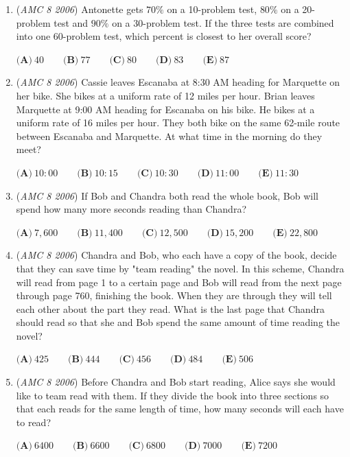 \begin{enumerate}
	\item (\textit{AMC 8 2006}) Antonette gets $70 \%$ on a 10-problem test, $80 \%$ on a 20-problem test and $90 \%$ on a 30-problem test. If the three tests are combined into one 60-problem test, which percent is closest to her overall score? 


 $\textbf{(A)}\ 40\qquad\textbf{(B)}\ 77\qquad\textbf{(C)}\ 80\qquad\textbf{(D)}\ 83\qquad\textbf{(E)}\ 87$


	\item (\textit{AMC 8 2006}) Cassie leaves Escanaba at 8:30 AM heading for Marquette on her bike. She bikes at a uniform rate of 12 miles per hour. Brian leaves Marquette at 9:00 AM heading for Escanaba on his bike. He bikes at a uniform rate of 16 miles per hour. They both bike on the same 62-mile route between Escanaba and Marquette. At what time in the morning do they meet? 


 $\textbf{(A)}\ 10: 00\qquad\textbf{(B)}\ 10: 15\qquad\textbf{(C)}\ 10: 30\qquad\textbf{(D)}\ 11: 00\qquad\textbf{(E)}\ 11: 30$


	\item (\textit{AMC 8 2006}) If Bob and Chandra both read the whole book, Bob will spend how many more seconds reading than Chandra? 


 $\textbf{(A)}\ 7,600\qquad\textbf{(B)}\ 11,400\qquad\textbf{(C)}\ 12,500\qquad\textbf{(D)}\ 15,200\qquad\textbf{(E)}\ 22,800$


	\item (\textit{AMC 8 2006}) Chandra and Bob, who each have a copy of the book, decide that they can save time by "team reading" the novel. In this scheme, Chandra will read from page 1 to a certain page and Bob will read from the next page through page 760, finishing the book. When they are through they will tell each other about the part they read. What is the last page that Chandra should read so that she and Bob spend the same amount of time reading the novel?


 $\textbf{(A)}\ 425\qquad\textbf{(B)}\ 444\qquad\textbf{(C)}\ 456\qquad\textbf{(D)}\ 484\qquad\textbf{(E)}\ 506$


	\item (\textit{AMC 8 2006}) Before Chandra and Bob start reading, Alice says she would like to team read with them. If they divide the book into three sections so that each reads for the same length of time, how many seconds will each have to read? 


 $\textbf{(A)}\ 6400\qquad\textbf{(B)}\ 6600\qquad\textbf{(C)}\ 6800\qquad\textbf{(D)}\ 7000\qquad\textbf{(E)}\ 7200$



\end{enumerate}
